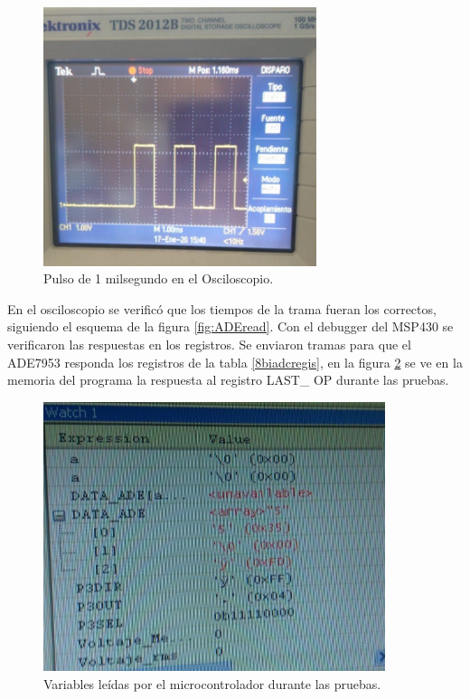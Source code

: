 \begin{figure}[!htb]
	\centering
	\includegraphics[width=80mm,keepaspectratio]{Figures/osciloscope.jpg}
	\caption{ Pulso de 1 milsegundo en el Osciloscopio.}
	\label{fig:Osciloscopp}
\end{figure}

En el osciloscopio se verificó que los tiempos de la trama fueran los correctos, siguiendo el esquema de la figura \ref{fig:ADEread}. Con el debugger del MSP430 se verificaron las respuestas en los registros. Se enviaron tramas para que el ADE7953 responda los registros de la tabla \ref{8biadcregis}, en la figura \ref{fig:ADEresp} se ve en la memoria del programa la respuesta al registro LAST\_ OP durante las pruebas.



\begin{figure}[!htb]
	\centering
	\includegraphics[width=100mm,keepaspectratio]{Figures/ADEresponse.jpg}
	\caption{ Variables leídas por el microcontrolador durante las pruebas.}
	\label{fig:ADEresp}
\end{figure}



